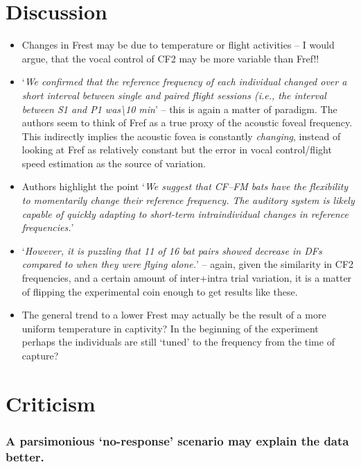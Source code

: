 \documentclass[
]{book}
\providecommand{\tightlist}{%
  \setlength{\itemsep}{0pt}\setlength{\parskip}{0pt}}
\begin{document}
\hypertarget{discussion-9}{%
\section{Discussion}\label{discussion-9}}

\begin{itemize}
\tightlist
\item
  Changes in Frest may be due to temperature or flight activities -- I would argue, that the vocal control of CF2 may be more variable than Fref!!
\item
  `\emph{We confirmed that the reference frequency of each individual changed over a short interval between
  single and paired flight sessions (i.e., the interval between S1 and P1 was\textbackslash10 min}' -- this is again a matter of paradigm. The authors seem to think of Fref as a true proxy of the acoustic foveal frequency. This indirectly implies the acoustic fovea is constantly \emph{changing}, instead of looking at Fref as relatively constant but the error in vocal control/flight speed estimation as the source of variation.
\item
  Authors highlight the point `\emph{We suggest that CF--FM bats have the flexibility to momentarily change their reference frequency. The auditory system is likely capable of quickly adapting to short-term intraindividual changes in reference frequencies.}'
\item
  `\emph{However, it is puzzling that 11 of 16 bat pairs showed decrease in DFs compared to when they were flying alone.}' -- again, given the similarity in CF2 frequencies, and a certain amount of inter+intra trial variation, it is a matter of flipping the experimental coin enough to get results like these.
\item
  The general trend to a lower Frest may actually be the result of a more uniform temperature in captivity? In the beginning of the experiment perhaps the individuals are still `tuned' to the frequency from the time of capture?
\end{itemize}

\hypertarget{criticism}{%
\section{Criticism}\label{criticism}}

\hypertarget{a-parsimonious-no-response-scenario-may-explain-the-data-better.}{%
\subsubsection{A parsimonious `no-response' scenario may explain the data better.}\label{a-parsimonious-no-response-scenario-may-explain-the-data-better.}}
\end{document}
